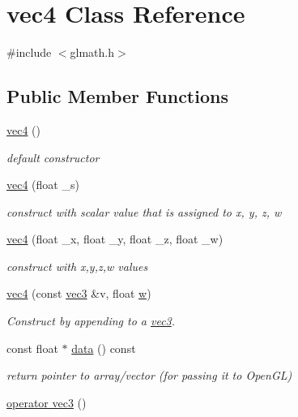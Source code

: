 \hypertarget{classvec4}{}\section{vec4 Class Reference}
\label{classvec4}


{\ttfamily \#include $<$glmath.\+h$>$}

\subsection*{Public Member Functions}
\begin{DoxyCompactItemize}
\item 
\hyperlink{classvec4_aa29685cf2528dae6ad7d74a7e01c1d6f}{vec4} ()
\begin{DoxyCompactList}\small\item\em default constructor \end{DoxyCompactList}\item 
\hyperlink{classvec4_ae1b8361552262b9f52f0e164086b52fa}{vec4} (float \+\_\+s)
\begin{DoxyCompactList}\small\item\em construct with scalar value that is assigned to x, y, z, w \end{DoxyCompactList}\item 
\hyperlink{classvec4_aefebfcef5cfacc8d070c28f4c84709f2}{vec4} (float \+\_\+x, float \+\_\+y, float \+\_\+z, float \+\_\+w)
\begin{DoxyCompactList}\small\item\em construct with x,y,z,w values \end{DoxyCompactList}\item 
\hyperlink{classvec4_aade8ea71d3496e4704c54725921b9a0e}{vec4} (const \hyperlink{classvec3}{vec3} \&v, float \hyperlink{classvec4_a0c92fe67e490d9768217a00c2e8abd49}{w})
\begin{DoxyCompactList}\small\item\em Construct by appending to a \hyperlink{classvec3}{vec3}. \end{DoxyCompactList}\item 
const float $\ast$ \hyperlink{classvec4_a5fd305cabd88de4f64e9fb6bab95df89}{data} () const 
\begin{DoxyCompactList}\small\item\em return pointer to array/vector (for passing it to Open\+GL) \end{DoxyCompactList}\item 
\hyperlink{classvec4_aa833810e2ec237c4a1668b982b902d86}{operator vec3} ()

\end{DoxyCompactItemize}

